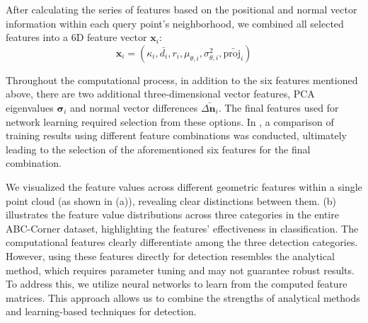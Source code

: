 \documentclass[lettersize,journal]{IEEEtran}
\begin{document}
After calculating the series of features based on the positional and normal vector information within each query point’s neighborhood, we combined all selected features into a 6D feature vector \( \mathbf{x}_i \): 
\begin{equation}
    \mathbf{x}_i = (\kappa_i, \bar{d_i}, r_i, \mu_{\theta,i}, \sigma^2_{\theta,i}, \bar{\text{proj}_i})
    \label{eq:x_i}
\end{equation}

Throughout the computational process, in addition to the six features mentioned above, there are two additional three-dimensional vector features, PCA eigenvalues $\mathbf{\sigma}_i$ and normal vector differences $\bar{\Delta \mathbf{n}_i}$. The final features used for network learning required selection from these options. In , a comparison of training results using different feature combinations was conducted, ultimately leading to the selection of the aforementioned six features for the final combination.

We visualized the feature values across different geometric features within a single point cloud (as shown in (a)), revealing clear distinctions between them. (b) illustrates the feature value distributions across three categories in the entire ABC-Corner dataset, highlighting the features' effectiveness in classification. The computational features clearly differentiate among the three detection categories. However, using these features directly for detection resembles the analytical method, which requires parameter tuning and may not guarantee robust results. To address this, we utilize neural networks to learn from the computed feature matrices. This approach allows us to combine the strengths of analytical methods and learning-based techniques for detection.
\end{document}
